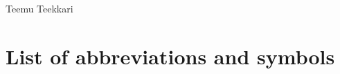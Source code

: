 \documentclass[12pt,a4paper,english]{tutthesis}
\begin{document}
\begin{otherlanguage}{english}
Teemu Teekkari
%
%

\renewcommand\contentsname{Table of Contents} %
\setcounter{tocdepth}{3}                      %

\tableofcontents                              %

\renewcommand\listfigurename{List of Figures}  %
\listoffigures                                 %
\markboth{}{}                                  %

\renewcommand\listtablename{List of Tables}    %
\listoftables                                  %
\markboth{}{}                                  %


\lstlistoflistings                                %


%
%

\chapter*{List of abbreviations and symbols}
\markboth{}{}                                %


\end{otherlanguage}
\end{document}
